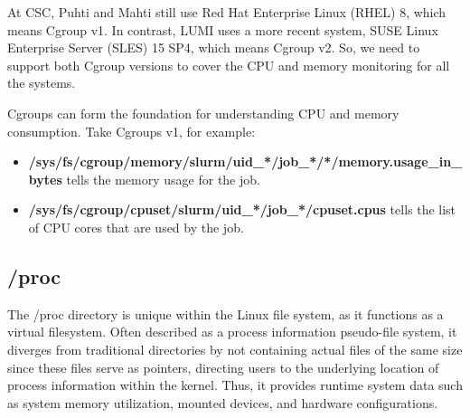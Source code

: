 
At CSC, Puhti and Mahti still use Red Hat Enterprise Linux (RHEL) 8, which means Cgroup v1. In contrast, LUMI uses a more recent system, SUSE Linux Enterprise Server (SLES) 15 SP4, which means Cgroup v2. So, we need to support both Cgroup versions to cover the CPU and memory monitoring for all the systems.

Cgroups can form the foundation for understanding CPU and memory consumption. Take Cgroups v1, for example:

\begin{itemize}
    \item \textbf{/sys/fs/cgroup/memory/slurm/uid\_*/job\_*/*/memory.usage\_in\_bytes} tells the memory usage for the job.
    \item \textbf{/sys/fs/cgroup/cpuset/slurm/uid\_*/job\_*/cpuset.cpus} tells the list of CPU cores that are used by the job.
\end{itemize}

\subsection{/proc}
The /proc \cite{5544096} directory is unique within the Linux file system, as it functions as a virtual filesystem. Often described as a process information pseudo-file system, it diverges from traditional directories by not containing actual files of the same size since these files serve as pointers, directing users to the underlying location of process information within the kernel. Thus, it provides runtime system data such as system memory utilization, mounted devices, and hardware configurations.

